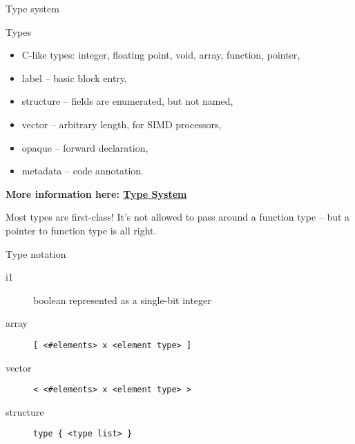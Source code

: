 \documentclass[8pt]{beamer}
\begin{document}
\begin{frame}[fragile]{Type system}
  \begin{block}{Types}
    \begin{itemize}
      \item C-like types: integer, floating point, void, array, function,
        pointer,
      \item label -- basic block entry,
      \item structure -- fields are enumerated, but not named,
      \item vector -- arbitrary length, for SIMD processors,
      \item opaque -- forward declaration,
      \item metadata -- code annotation.
    \end{itemize}
    \textbf{More information here: \href{http://llvm.org/docs/LangRef.html\#type-system}{Type System}}
  \end{block}

  \begin{alertblock}{}
    Most types are first-class! It's not allowed to pass around a function type
    -- but a pointer to function type is all right.
  \end{alertblock}

  \begin{block}{Type notation}
    \begin{description}
      \item[i1] boolean represented as a single-bit integer
      \item[array] \verb+[ <#elements> x <element type> ]+
      \item[vector] \verb+< <#elements> x <element type> >+
      \item[structure] \verb+type { <type list> }+
    \end{description}
  \end{block}
\end{frame}
\end{document}
